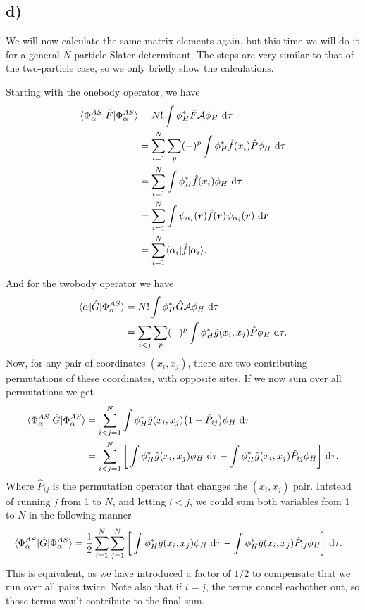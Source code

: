 \documentclass[a4paper, 11pt, notitlepage, english]{article}
\newcommand{\op}[1]{\hat{#1}}
\newcommand{\braopket}[3]{\langle #1 | {#2} | #3 \rangle}
\renewcommand{\d}{{\rm d}}
\newcommand{\bt}[1]{\boldsymbol{#1}}
\begin{document}
\subsection*{d)}
We will now calculate the same matrix elements again, but this time we will do it for a general $N$-particle Slater determinant. The steps are very similar to that of the two-particle case, so we only briefly show the calculations.

Starting with the onebody operator, we have
\begin{align*}
\braopket{\Phi^{AS}_{\alpha}}{\op{F}}{\Phi^{AS}_{\alpha}} &= N!\int \phi_H^* \op{F} \mathcal{A} \phi_H \ \d \tau \\
&= \sum_{i=1}^N \sum_p (-)^p \int \phi_H^* \op{f}(x_i) \op{P} \phi_H \ \d \tau \\
&= \sum_{i=1}^N \int \phi_H^* \op{f}(x_i) \phi_H \ \d \tau \\
&= \sum_{i=1}^N \int \psi_{\alpha_i}(\bt{r}) \op{f}(\bt{r}) \psi_{\alpha_i}(\bt{r}) \ \d \bt{r} \\
&= \sum_{i=1}^N \braopket{\alpha_i}{\op{f}}{\alpha_i}.
\end{align*}

And for the twobody operator we have
\begin{align*}
\braopket{\alpha}{\op{G}}{\Phi^{AS}_{\alpha}} &= N!\int \phi_H^* \op{G} \mathcal{A} \phi_H \ \d \tau \\
&= \sum_{i<j} \sum_p (-)^p \int \phi_H^* \op{g}(x_i,x_j) \op{P} \phi_H \ \d \tau.
\end{align*}
Now, for any pair of coordinates $(x_i, x_j)$, there are two contributing permutations of these coordinates, with opposite sites. If we now sum over all permutations we get
\begin{align*}
\braopket{\Phi^{AS}_{\alpha}}{\op{G}}{\Phi^{AS}_{\alpha}} 
&= \sum_{i<j=1}^N \int \phi_H^* \op{g}(x_i,x_j) \big(1 - \op{P}_{ij}\big) \phi_H \ \d \tau \\
&= \sum_{i<j=1}^N \bigg[\int \phi_H^* \op{g}(x_i,x_j) \phi_H \ \d \tau - \int \phi_H^* \op{g}(x_i,x_j) \op{P}_{ij} \phi_H \bigg] \ \d \tau.
\end{align*}
Where $\op{P}_{ij}$ is the permutation operator that changes the $(x_i, x_j)$ pair. Intstead of running $j$ from 1 to $N$, and letting $i<j$, we could sum both variables from 1 to $N$ in the following manner
\begin{align*}
\braopket{\Phi^{AS}_{\alpha}}{\op{G}}{\Phi^{AS}_{\alpha}} 
&= \frac{1}{2}\sum_{i=1}^N\sum_{j=1}^N \bigg[\int \phi_H^* \op{g}(x_i,x_j) \phi_H \ \d \tau - \int \phi_H^* \op{g}(x_i,x_j) \op{P}_{ij} \phi_H \bigg] \ \d \tau.
\end{align*}
This is equivalent, as we have introduced a factor of $1/2$ to compensate that we run over all pairs twice. Note also that if $i=j$, the terms cancel eachother out, so those terms won't contribute to the final sum.
\end{document}
